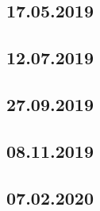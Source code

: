 \documentclass[a4paper,12p]{article}
\begin{document}
	\newpage	
	\subsection{17.05.2019}
	
	
	\newpage
	\subsection{12.07.2019}
	
	
	
	
	
	\newpage
	\subsection{27.09.2019}
	\subsection{08.11.2019}
	\subsection{07.02.2020}
\end{document}
